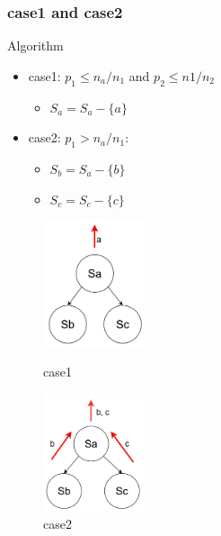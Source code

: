 \documentclass[notheorems, aspectratio=54]{beamer}
\begin{document}
\begin{frame}
    \frametitle{case1 and case2}
    \begin{block}{Algorithm}
        \begin{itemize}
            \item case1: $p_1 \leq n_a/n_1$  and  $p_2 \leq n1/n_2$
            \begin{itemize}
                \item $S_a = S_a - \{a\}$
            \end{itemize}
            \item case2: $p_1 > n_a/n_1$:
            \begin{itemize}
                \item $S_b = S_a - \{b\}$
                \item $S_c = S_c - \{c\}$
            \end{itemize}
        \end{itemize} 
    \end{block}
    \begin{figure}[htbp]
        \centering
        \begin{minipage}[t]{0.48\textwidth}
        \centering
        \includegraphics[width=3cm]{global_img_dir/Sampling1.png}
        \caption{case1}
        \end{minipage}
        \begin{minipage}[t]{0.48\textwidth}
        \centering
        \includegraphics[width=3cm]{global_img_dir/Sampling2.png}
        \caption{case2}
        \end{minipage}
    \end{figure}
\end{frame}
\end{document}
